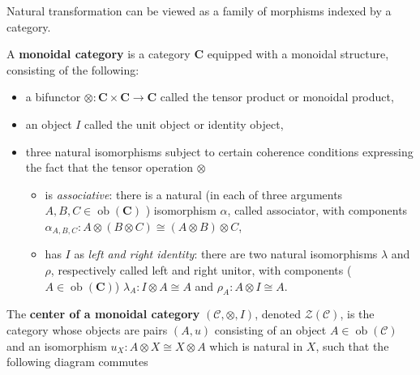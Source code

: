 \documentclass[12pt, letterpaper]{article}
\newcommand{\ob}{\operatorname{ob}}
\newcommand{\bfC}{\mathbf{C}}
\theoremstyle{definition}
\theoremstyle{remark}
\theoremstyle{definition}
\theoremstyle{plain}
\numberwithin{equation}{section}
\begin{document}
	Natural transformation can be viewed as a family of morphisms indexed by a category.
	
	\begin{def*}
		A \textbf{monoidal category} is a category $\bfC$ equipped with a monoidal structure, consisting of the following:
		
		\begin{itemize}
			\item a bifunctor $\otimes \colon \bfC \times \bfC \to \bfC$ called the tensor product or monoidal product,
			\item an object $I$ called the unit object or identity object,
			\item three natural isomorphisms subject to certain coherence conditions expressing the fact that the tensor operation
			$\otimes$
			\begin{itemize}
				\item is \textit{associative}:
				there is a natural (in each of three arguments $A,B,C\in \ob(\bfC)$ ) isomorphism $\alpha$, called associator,
				with components $\alpha _{A,B,C}\colon A\otimes (B\otimes C)\cong (A\otimes B)\otimes C$,
				\item has $I$ as \textit{left and right identity}:
				there are two natural isomorphisms $\lambda$  and $\rho$, respectively called left and right unitor,
				with components ($A\in\ob(\bfC)$) $\lambda_A \colon I\otimes A\cong A$
				 and $\rho_A \colon A\otimes I\cong A$.
			\end{itemize}
		\end{itemize}
	\end{def*}
	\begin{def*}
		The \textbf{center of a monoidal category} $({\mathcal {C}},\otimes ,I)$, denoted $\mathcal  {Z(C)}$,
		is the category whose objects are pairs $(A,u)$ consisting of an object $A\in \ob(\mathcal {C})$
		and an isomorphism $u_{X}\colon A\otimes X\cong X\otimes A$
		which is natural in $X$, such that the following diagram commutes
		\begin{center}
		\end{center}
	\end{def*}
	
\end{document}
